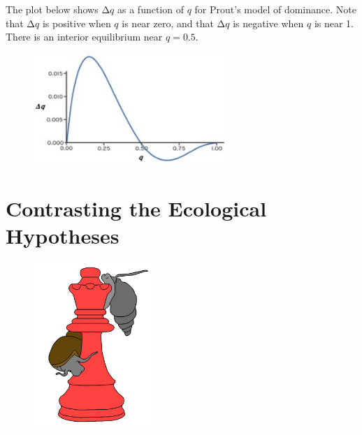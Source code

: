 \documentclass[
  letterpaper,
]{book}
\begin{document}
\begin{tcolorbox}
The plot below shows \(\mathrm{\Delta}q\) as a function of \(q\) for
Prout's model of dominance. Note that \(\mathrm{\Delta}q\) is positive
when \(q\) is near zero, and that \(\mathrm{\Delta}q\) is negative when
\(q\) is near 1. There is an interior equilibrium near \(q = 0.5\).

\begin{figure}[H]

{\centering \includegraphics[width=0.65\textwidth,height=\textheight]{images/fig2-5.jpg}

}

\end{figure}

\end{tcolorbox}


\hypertarget{contrasting-the-ecological-hypotheses}{%
\chapter{Contrasting the Ecological
Hypotheses}\label{contrasting-the-ecological-hypotheses}}

\begin{figure}

{\centering \includegraphics[width=0.4\textwidth,height=\textheight]{images/fig3-1.jpeg}

}

\end{figure}
\end{document}
